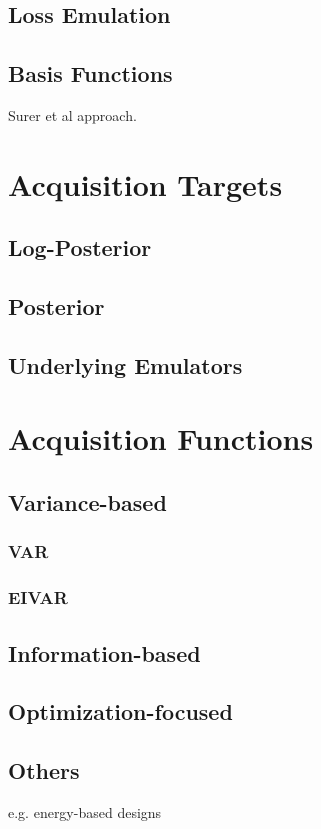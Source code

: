 \documentclass[12pt]{article}
\begin{document}
\subsection{Loss Emulation}
\subsection{Basis Functions}
Surer et al approach. 

\section{Acquisition Targets}
\subsection{Log-Posterior}
\subsection{Posterior}
\subsection{Underlying Emulators}

\section{Acquisition Functions}
\subsection{Variance-based}
\subsubsection{VAR}
\subsubsection{EIVAR}
\subsection{Information-based}
\subsection{Optimization-focused}
\subsection{Others}
e.g. energy-based designs 
\end{document}
